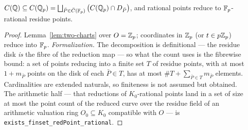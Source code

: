 \begin{lemma}
\label{lem:disk-decomp}
\leanok
$C(\mathbb{Q}) \subseteq C(\mathbb{Q}_p) = \bigsqcup_{\bar P \in \bar C(\mathbb{F}_p)} \big(C(\mathbb{Q}_p) \cap
D_{\bar P}\big)$, and rational points reduce to $\mathbb{F}_p$-rational residue points.
\end{lemma}
\begin{proof}
\leanok
Lemma~\ref{lem:two-charts} over $O = \mathbb{Z}_p$; coordinates in $\mathbb{Z}_p$ (or $t \in p\mathbb{Z}_p$)
reduce into $\mathbb{F}_p$. \emph{Formalization.} The decomposition is definitional --- the
residue disk \emph{is} the fibre of the reduction map --- so what the count uses is the
fibrewise bound: a set of points reducing into a finite set $T$ of residue points, with
at most $1 + m_{\bar P}$ points on the disk of each $\bar P \in T$, has at most
$\#T + \sum_{\bar P \in T} m_{\bar P}$ elements. Cardinalities are extended naturals,
so finiteness is not assumed but obtained. The arithmetic half --- that reductions of
$K_0$-rational points land in a set of size at most the point count of the reduced
curve over the residue field of an arithmetic valuation ring $O_0 \subseteq K_0$
compatible with $O$ --- is \texttt{exists\_finset\_redPoint\_rational}.
\end{proof}

